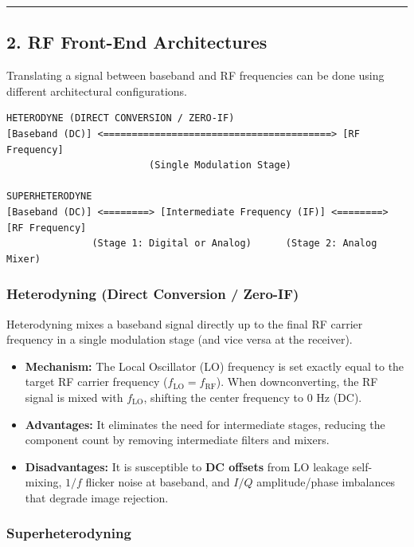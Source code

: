 \documentclass[
]{article}
\providecommand{\tightlist}{%
  \setlength{\itemsep}{0pt}\setlength{\parskip}{0pt}}
\begin{document}
\begin{center}\rule{0.5\linewidth}{0.5pt}\end{center}

\subsection{2. RF Front-End
Architectures}\label{rf-front-end-architectures}

Translating a signal between baseband and RF frequencies can be done
using different architectural configurations.

\begin{verbatim}
HETERODYNE (DIRECT CONVERSION / ZERO-IF)
[Baseband (DC)] <========================================> [RF Frequency]
                         (Single Modulation Stage)

SUPERHETERODYNE
[Baseband (DC)] <========> [Intermediate Frequency (IF)] <========> [RF Frequency]
               (Stage 1: Digital or Analog)      (Stage 2: Analog Mixer)
\end{verbatim}

\subsubsection{Heterodyning (Direct Conversion /
Zero-IF)}\label{heterodyning-direct-conversion-zero-if}

Heterodyning mixes a baseband signal directly up to the final RF carrier
frequency in a single modulation stage (and vice versa at the receiver).

\begin{itemize}
\tightlist
\item
  \textbf{Mechanism:} The Local Oscillator (LO) frequency is set exactly
  equal to the target RF carrier frequency
  (\(f_{\text{LO}} = f_{\text{RF}}\)). When downconverting, the RF
  signal is mixed with \(f_{\text{LO}}\), shifting the center frequency
  to \(0\text{ Hz}\) (DC).
\item
  \textbf{Advantages:} It eliminates the need for intermediate stages,
  reducing the component count by removing intermediate filters and
  mixers.
\item
  \textbf{Disadvantages:} It is susceptible to \textbf{DC offsets} from
  LO leakage self-mixing, \(1/f\) flicker noise at baseband, and \(I/Q\)
  amplitude/phase imbalances that degrade image rejection.
\end{itemize}

\subsubsection{Superheterodyning}\label{superheterodyning}
\end{document}
